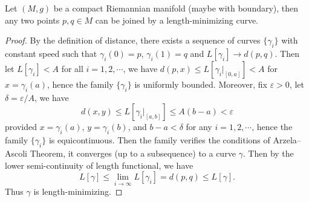 \begin{lem}\label{compact length-min}
    Let $(M,g)$ be a compact Riemannian manifold (maybe with boundary), then any two points $p,q\in M$ can be joined by a length-minimizing curve.
\end{lem}
\begin{proof}
    By the definition of distance, there exists a sequence of curves $\{\gamma_i\}$ with constant speed such that $\gamma_i(0)=p$, $\gamma_i(1)=q$ and $L[\gamma_i]\to d(p,q)$.
    Then let $L[\gamma_i]<A$ for all $i=1,2,\cdots$, we have $d(p,x)\leq L[\gamma_i|_{[0,a]}]<A$ for $x=\gamma_i(a)$, hence the family $\{\gamma_i\}$ is uniformly bounded.
    Moreover, fix $\varepsilon>0$, let $\delta=\varepsilon/A$, we have
    \[d(x,y)\leq L[\gamma_i|_{[a,b]}]\leq A(b-a)<\varepsilon\]
    provided $x=\gamma_i(a)$, $y=\gamma_i(b)$, and $b-a<\delta$ for any $i=1,2,\cdots$, hence the family $\{\gamma_i\}$ is equicontinuous.
    Then the family verifies the conditions of Arzela--Ascoli Theorem, it converges (up to a subsequence) to a curve $\gamma$.
    Then by the lower semi-continuity of length functional, we have
    \[L[\gamma]\leq\lim_{i\to\infty}L[\gamma_i]=d(p,q)\leq L[\gamma].\]
    Thus $\gamma$ is length-minimizing.
\end{proof}

